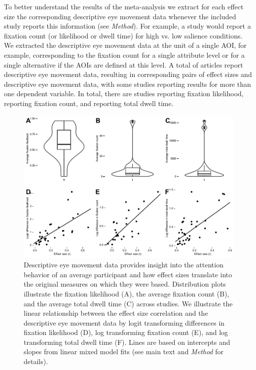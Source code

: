 To better understand the results of the meta-analysis we extract for each effect size the corresponding descriptive eye movement data whenever the included study reports this information (see \textit{Method}). For example, a study would report a fixation count (or likelihood or dwell time) for high vs. low salience conditions. We extracted the descriptive eye movement data at the unit of a single AOI, for example, corresponding to the fixation count for a single attribute level or for a single alternative if the AOIs are defined at this level. A total of \unskip articles report descriptive eye movement data, resulting in \unskip corresponding pairs of effect sizes and descriptive eye movement data, with some studies reporting results for more than one dependent variable. In total, there are \unskip studies reporting fixation likelihood, \unskip reporting fixation count, and \unskip reporting total dwell time.


\begin{figure}[!h]
\includegraphics{figs/EMtoES.pdf}
\centering
\caption{Descriptive eye movement data provides insight into the attention behavior of an average participant and how effect sizes translate into the original measures on which they were based. Distribution plots illustrate the fixation likelihood (A), the average fixation count (B), and the average total dwell time (C) across studies. We illustrate the linear relationship between the effect size correlation and the descriptive eye movement data by logit transforming differences in fixation likelihood (D), log transforming fixation count (E), and log transforming total dwell time (F). Lines are based on intercepts and slopes from linear mixed model fits (see main text and \textit{Method} for details).}
\label{fig:em_figure}
\end{figure}


